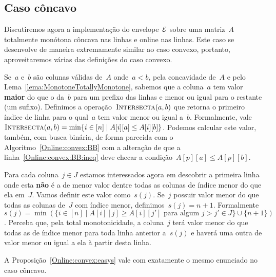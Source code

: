 
\subsection{Caso côncavo} \label{Online:concave}

Discutiremos agora a implementação do envelope~$\mathcal{E}$ sobre uma matriz~$A$ totalmente monótona côncava nas linhas e online nas linhas. Este caso se desenvolve de maneira extremamente similar ao caso convexo, portanto, aproveitaremos várias das definições do caso convexo.

Se~$a$ e~$b$ são colunas válidas de~$A$ onde~$a < b$, pela concavidade de~$A$ e pelo Lema~\ref{lema:MonotoneTotallyMonotone}, sabemos que a coluna~$a$ tem valor \textbf{maior} do que o da~$b$ para um prefixo das linhas e menor ou igual para o restante (um sufixo). Definimos a operação~$\textsc{Intersecta}(a,b)$ que retorna o primeiro índice de linha para o qual~$a$ tem valor menor ou igual a~$b$. Formalmente, vale~${\textsc{Intersecta}(a,b) = \min\{i \in [n] \mid A[i][a] \leq A[i][b]\}}$. Podemos calcular este valor, também, com busca binária, de forma parecida com o Algoritmo~\ref{Online:convex:BB} com a alteração de que a linha~\ref{Online:convex:BB:ineq} deve checar a condição~$A[p][a] \leq A[p][b]$.

Para cada coluna~$j \in J$ estamos interessados agora em descobrir a primeira linha onde esta \textbf{não} é a de menor valor dentre todas as colunas de índice menor do que ela em~$J$. Vamos definir este valor como~$s(j)$. Se~$j$ possuir valor menor do que todas as colunas de~$J$ com índice menor, definimos~$s(j) = n+1$. Formalmente~$ {s(j) = \min(\{ i \in [n] \mid A[i][j] \geq A[i][j'] \text{ para algum } j > j' \in J \} \cup \{n+1\})} $. Perceba que, pela total monotonicidade, a coluna~$j$ terá valor menor do que todas as de índice menor para toda linha anterior a~$s(j)$ e haverá uma outra de valor menor ou igual a ela à partir desta linha.

\begin{prop} \label{Online:concave:easys}
A Proposição~\ref{Online:convex:easys} vale com exatamente o mesmo enunciado no caso côncavo.
\end{prop}

